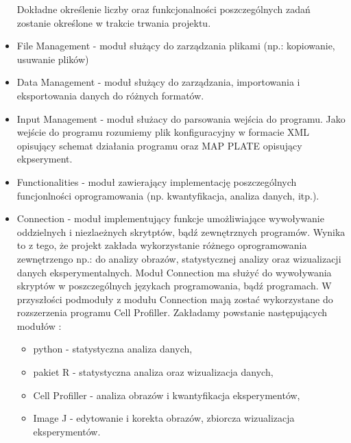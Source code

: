 \begin{itemize}
Dokładne określenie liczby oraz funkcjonalności poszczególnych zadań zostanie określone w trakcie trwania projektu.

\item File Management - moduł służący do zarządzania plikami (np.: kopiowanie, usuwanie plików)
\item Data Management - moduł służący do zarządzania, importowania i eksportowania danych do różnych formatów.
\item Input Management - moduł służacy do parsowania wejścia do programu. Jako wejście do programu rozumiemy plik konfiguracyjny w formacie XML opisujący schemat działania programu oraz MAP PLATE opisujący ekpseryment.
\item Functionalities - moduł zawierający implementację poszczególnych funcjonlności oprogramowania (np. kwantyfikacja, analiza danych, itp.).
\item Connection - moduł implementujący funkcje umożliwiające wywoływanie oddzielnych i niezlaeżnych skrytptów, bądź zewnętrznych programów. Wynika to z tego, że projekt zakłada wykorzystanie różnego oprogramowania zewnętrzengo np.:  do analizy obrazów, statystycznej analizy oraz wizualizacji danych eksperymentalnych. Moduł Connection ma służyć do wywoływania skryptów w poszczególnych językach programowania, bądź programach. W przyszłości podmoduły z modułu Connection mają zostać wykorzystane do rozszerzenia  programu Cell Profiller.
Zakładamy powstanie następujących modułów :
\begin{itemize}
\item python -  statystyczna analiza danych,
\item pakiet R - statystyczna analiza oraz wizualizacja danych,
\item Cell Profiller - analiza obrazów i kwantyfikacja eksperymentów,
\item Image J - edytowanie i korekta obrazów, zbiorcza wizualizacja eksperymentów.
\end{itemize}
\end{itemize}


